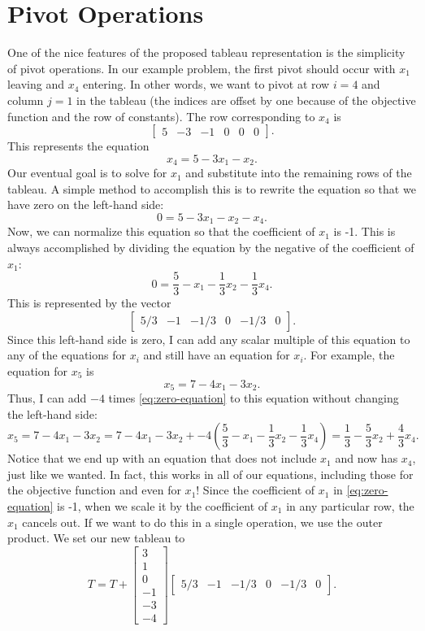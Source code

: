 \section{Pivot Operations}

One of the nice features of the proposed tableau representation is the simplicity of pivot operations. In our example problem, the first pivot should occur with $x_1$ leaving and $x_4$ entering. In other words, we want to pivot at row $i = 4$ and column $j = 1$ in the tableau (the indices are offset by one because of the objective function and the row of constants). The row corresponding to $x_4$ is
\[
\begin{bmatrix} 5 &-3 &-1 & 0 & 0 & 0\end{bmatrix}.
\]
This represents the equation
\[
	x_4 = 5 - 3x_1 - x_2.
\]
Our eventual goal is to solve for $x_1$ and substitute into the remaining rows of the tableau. A simple method to accomplish this is to rewrite the equation so that we have zero on the left-hand side:
\[
	0 = 5 - 3x_1 - x_2 - x_4.
\]
Now, we can normalize this equation so that the coefficient of $x_1$ is -1. This is always accomplished by dividing the equation by the negative of the coefficient of $x_1$:
\begin{equation}\label{eq:zero-equation}
	0 = \frac{5}{3} - x_1 - \frac{1}{3}x_2 - \frac{1}{3}x_4.
\end{equation}
This is represented by the vector
\[
	\begin{bmatrix} 5/3 & -1 & -1/3 & 0 & -1/3 & 0\end{bmatrix}.
\]
Since this left-hand side is zero, I can add any scalar multiple of this equation to any of the equations for $x_i$ and still have an equation for $x_i$. For example, the equation for $x_5$ is
\[
	x_5 = 7 - 4x_1 - 3x_2.
\]
Thus, I can add $-4$ times \eqref{eq:zero-equation} to this equation without changing the left-hand side:
\[ x_5 = 7 - 4x_1 - 3x_2 = 7 - 4x_1 - 3x_2 + -4\left(\frac{5}{3} - x_1 - \frac{1}{3}x_2 - \frac{1}{3}x_4\right) = \frac{1}{3} - \frac{5}{3}x_2 + \frac{4}{3} x_4.
\]
Notice that we end up with an equation that does not include $x_1$ and now has $x_4$, just like we wanted. In fact, this works in all of our equations, including those for the objective function and even for $x_1$! Since the coefficient of $x_1$ in \eqref{eq:zero-equation} is -1, when we scale it by the coefficient of $x_1$ in any particular row, the $x_1$ cancels out. If we want to do this in a single operation, we use the outer product. We set our new tableau to
\[
	T = T + \begin{bmatrix}3 \\ 1 \\ 0 \\ -1 \\ -3 \\ -4\end{bmatrix}\begin{bmatrix} 5/3 & -1 & -1/3 & 0 & -1/3 & 0\end{bmatrix}.
\]
